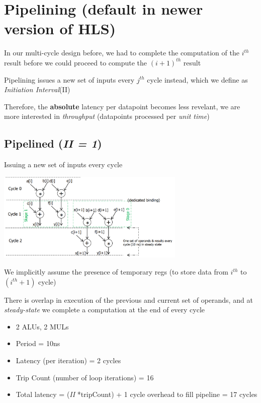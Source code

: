 \documentclass{article}
\begin{document}
\section{Pipelining (default in newer version of HLS)}
In our multi-cycle design before, we had to complete the computation of the $i^{th}$ result before we could proceed to compute the $(i+1)^{th}$ result

Pipelining issues a new set of inputs every $j^{th}$ cycle instead, which we define as \textit{Initiation Interval}(II)

Therefore, the \textbf{absolute} latency per datapoint becomes less revelant, we are more interested in \textit{throughput} (datapoints processed per \textit{unit time})
\subsection{Pipelined (\textit{II = 1})}
Issuing a new set of inputs every cycle

\begin{minipage}[t]{0.5\textwidth}
    \vspace{0pt}
    \includegraphics[width=9cm, scale=1]{S2/pipeline_II1_schedule.PNG}
\end{minipage}%
\begin{minipage}[t]{0.5\textwidth}
    \vspace{0pt}
    We implicitly assume the presence of temporary regs (to store data from $i^{th}$ to $(i^{th} + 1)$ cycle) \newline

    There is overlap in execution of the previous and current set of operands, 
    and at \textit{steady-state} we complete a computation at the end of every cycle \newline

    \begin{itemize}
        \item 2 ALUs, 2 MULs
        \item Period = 10ns
        \item Latency (per iteration) = 2 cycles
        \item Trip Count (number of loop iterations) = 16
        \item Total latency = (\textit{II} *tripCount) + 1 cycle overhead to fill pipeline = 17 cycles
    \end{itemize}
\end{minipage}
\end{document}
